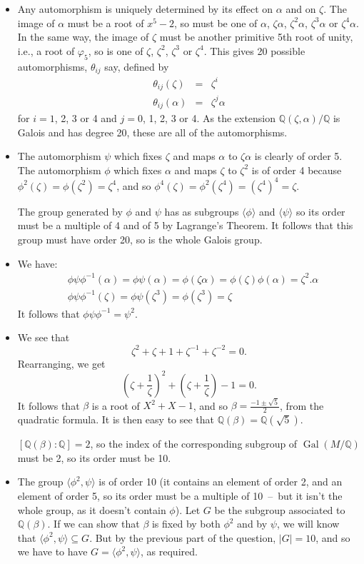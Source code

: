 \documentclass{amsart}
\newcommand{\Gal}       {\operatorname{Gal}}
\newcommand{\Q}         {{\mathbb{Q}}}
\newcommand{\al}        {\alpha}
\newcommand{\bt}        {\beta}
\newcommand{\zt}        {\zeta}
\newcommand{\vph}       {\varphi}
\renewcommand{\:}{\colon}
\newenvironment{solution}{\SolutionInline}{\endSolutionInline}
\theoremstyle{definition}
\renewenvironment{solution}{\SolutionAtEnd}{\endSolutionAtEnd}
\begin{document}
\begin{solution}
 \begin{itemize}
  \item Any automorphism is uniquely determined by its effect on $\al$
  and on $\zt$. The image of $\al$ must be a root of $x^5-2$, so
  must be one of $\al$, $\zt\al$, $\zt^2\al$, $\zt^3\al$
  or $\zt^4\al$. In the same way, the image of $\zt$ must be another
  primitive 5th root of unity, i.e., a root of $\vph_5$, so is one of
  $\zt$, $\zt^2$, $\zt^3$ or $\zt^4$. This gives 20 possible
  automorphisms, $\theta_{ij}$ say, defined by
  \begin{eqnarray*}
  \theta_{ij}(\zt)&=&\zt^i\\
  \theta_{ij}(\al)&=&\zt^j\al
  \end{eqnarray*}
  for $i=1$, 2, 3 or 4 and $j=0$, 1, 2, 3 or 4.
  As the extension
  $\Q(\zt,\al)/\Q$ is Galois and has degree 20, these are all of
  the automorphisms.
  \item The automorphism $\psi$ which fixes $\zt$ and maps
  $\al$ to $\zt\al$ is clearly of order 5. The automorphism 
  $\phi$ which fixes $\al$ and maps $\zt$ to $\zt^2$ is of order 4
  because $\phi^2(\zt)=\phi(\zt^2)=\zt^4$, and so
  $\phi^4(\zt)=\phi^2(\zt^4)=(\zt^4)^4=\zt$. 

  The group generated by
  $\phi$ and $\psi$ has as subgroups $\langle\phi\rangle$ and $\langle\psi\rangle$
  so its order must be a multiple of 4 and of 5 by Lagrange's Theorem. It follows
  that this group must have order 20, so is the whole Galois group.
  \item We have:
  \begin{eqnarray*}
  &\phi\psi\phi^{-1}(\al)=\phi\psi(\al)=\phi(\zt\al)=\phi(\zt)\phi(\al)=\zt^2.\al\\
  &\phi\psi\phi^{-1}(\zt)=\phi\psi(\zt^3)=\phi(\zt^3)=\zt
  \end{eqnarray*}
  It follows that $\phi\psi\phi^{-1}=\psi^2$.
  \item We see that
  $$\zt^2+\zt+1+\zt^{-1}+\zt^{-2}=0.$$
  Rearranging, we get
  $$(\zt+\frac{1}{\zt})^2+(\zt+\frac{1}{\zt})-1=0.$$
  It follows that $\bt$ is a root of $X^2+X-1$, and so 
  $\bt=\frac{-1\pm\sqrt{5}}{2}$, from the quadratic formula. It is then
  easy to see that $\Q(\bt)=\Q(\sqrt{5})$.

  $[\Q(\bt):\Q]=2$, so the index of the corresponding subgroup of
  $\Gal(M/\Q)$ must be 2, so its order must be 10.
  \item The group $\langle\phi^2,\psi\rangle$ is of order 10 (it contains
  an element of order 2, and an element of order 5, so its order must be a
  multiple of 10~--~but it isn't the whole group, as it doesn't contain $\phi$).
  Let $G$ be the subgroup associated to $\Q(\bt)$.
  If we can show that $\bt$ is fixed by both $\phi^2$ and by $\psi$, we
  will know that $\langle\phi^2,\psi\rangle\subseteq G$. But by the
  previous part of the question, $|G|=10$, and so we have to have 
  $G=\langle\phi^2,\psi\rangle$, as required.


\end{itemize}
\end{solution}
\end{document}
